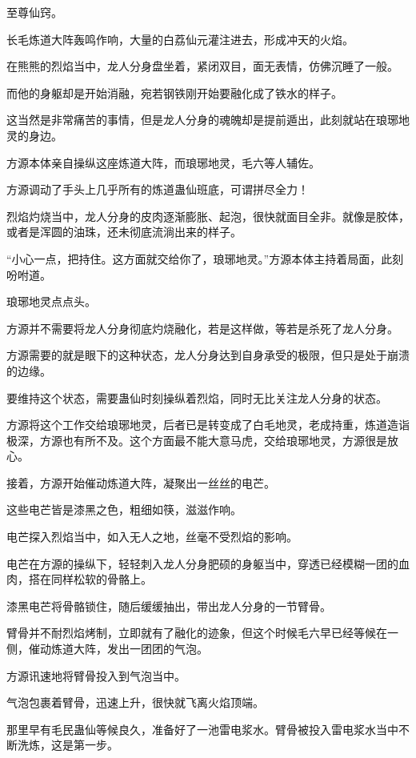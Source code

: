 
\begin{this_body}

至尊仙窍。

长毛炼道大阵轰鸣作响，大量的白荔仙元灌注进去，形成冲天的火焰。

在熊熊的烈焰当中，龙人分身盘坐着，紧闭双目，面无表情，仿佛沉睡了一般。

而他的身躯却是开始消融，宛若钢铁刚开始要融化成了铁水的样子。

这当然是非常痛苦的事情，但是龙人分身的魂魄却是提前遁出，此刻就站在琅琊地灵的身边。

方源本体亲自操纵这座炼道大阵，而琅琊地灵，毛六等人辅佐。

方源调动了手头上几乎所有的炼道蛊仙班底，可谓拼尽全力！

烈焰灼烧当中，龙人分身的皮肉逐渐膨胀、起泡，很快就面目全非。就像是胶体，或者是浑圆的油珠，还未彻底流淌出来的样子。

“小心一点，把持住。这方面就交给你了，琅琊地灵。”方源本体主持着局面，此刻吩咐道。

琅琊地灵点点头。

方源并不需要将龙人分身彻底灼烧融化，若是这样做，等若是杀死了龙人分身。

方源需要的就是眼下的这种状态，龙人分身达到自身承受的极限，但只是处于崩溃的边缘。

要维持这个状态，需要蛊仙时刻操纵着烈焰，同时无比关注龙人分身的状态。

方源将这个工作交给琅琊地灵，后者已是转变成了白毛地灵，老成持重，炼道造诣极深，方源也有所不及。这个方面最不能大意马虎，交给琅琊地灵，方源很是放心。

接着，方源开始催动炼道大阵，凝聚出一丝丝的电芒。

这些电芒皆是漆黑之色，粗细如筷，滋滋作响。

电芒探入烈焰当中，如入无人之地，丝毫不受烈焰的影响。

电芒在方源的操纵下，轻轻刺入龙人分身肥硕的身躯当中，穿透已经模糊一团的血肉，搭在同样松软的骨骼上。

漆黑电芒将骨骼锁住，随后缓缓抽出，带出龙人分身的一节臂骨。

臂骨并不耐烈焰烤制，立即就有了融化的迹象，但这个时候毛六早已经等候在一侧，催动炼道大阵，发出一团团的气泡。

方源讯速地将臂骨投入到气泡当中。

气泡包裹着臂骨，迅速上升，很快就飞离火焰顶端。

那里早有毛民蛊仙等候良久，准备好了一池雷电浆水。臂骨被投入雷电浆水当中不断洗炼，这是第一步。


\end{this_body}
